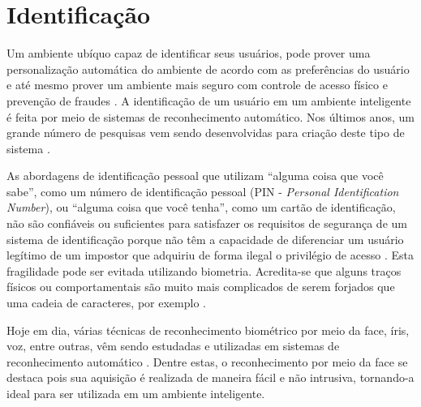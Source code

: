 	
	

	

\section{Identificação}
\label{sec:identificacao}
	
	Um ambiente ubíquo capaz de identificar seus usuários, pode prover uma
	personalização automática do ambiente de acordo com as preferências do usuário e
	até mesmo prover um ambiente mais seguro com controle de acesso físico e
	prevenção de fraudes \cite{saocarlos}. A identificação de um usuário em um
	ambiente inteligente é feita por meio de sistemas de reconhecimento automático.
	Nos últimos anos, um grande número de pesquisas vem sendo desenvolvidas para
	criação deste tipo de sistema  \cite{saocarlos}.
	
	As abordagens de identificação pessoal que utilizam ``alguma coisa que você
	sabe'', como um número de identificação pessoal (PIN - \textit{Personal
	Identification Number}), ou ``alguma coisa que você tenha'', como um cartão de identificação,
	não são confiáveis ou suficientes para satisfazer os requisitos de segurança de
	um sistema de identificação porque não têm a capacidade de diferenciar um usuário
	legítimo de um impostor que adquiriu de forma ilegal o privilégio de acesso
	\cite{hong}. Esta fragilidade pode ser evitada utilizando biometria.
	Acredita-se que alguns traços físicos ou comportamentais são muito mais
	complicados de serem forjados que uma cadeia de caracteres, por exemplo
	\cite{drovetto}.
	
	Hoje em dia, várias técnicas de reconhecimento biométrico por meio da face,
	íris, voz, entre outras, vêm sendo estudadas e utilizadas em sistemas de
	reconhecimento automático \cite{bolle}. Dentre estas, o reconhecimento por meio
	da face se destaca pois sua aquisição é realizada de maneira fácil e não
	intrusiva, tornando-a ideal para ser utilizada em um ambiente inteligente.
	


	
	
